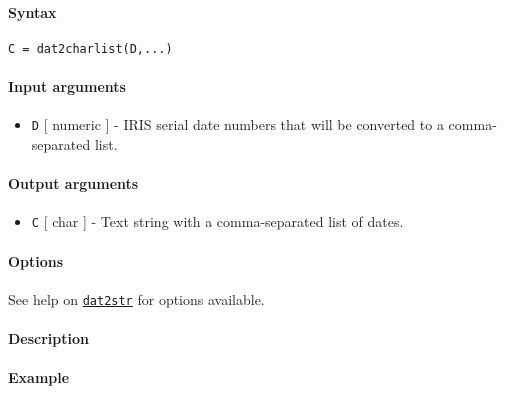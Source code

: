 


	\paragraph{Syntax}

\begin{verbatim}
C = dat2charlist(D,...)
\end{verbatim}

\paragraph{Input arguments}

\begin{itemize}
\itemsep1pt\parskip0pt
\item
  \texttt{D} {[} numeric {]} - IRIS serial date numbers that will be
  converted to a comma-separated list.
\end{itemize}

\paragraph{Output arguments}

\begin{itemize}
\itemsep1pt\parskip0pt
\item
  \texttt{C} {[} char {]} - Text string with a comma-separated list of
  dates.
\end{itemize}

\paragraph{Options}

See help on \href{dates/dat2str}{\texttt{dat2str}} for options
available.

\paragraph{Description}

\paragraph{Example}


